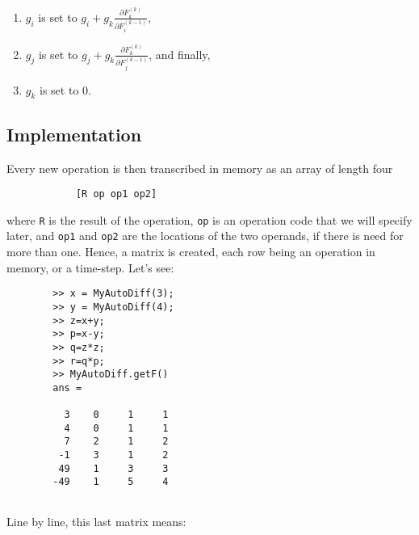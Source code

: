 \documentclass[titlepage]{article}
\theoremstyle{plain}
\theoremstyle{definition}
\begin{document}
		\begin{enumerate}
			\item $g_i$ is set to $g_{i}+g_{k} \frac{\partial F^{(k)}_k}{\partial F^{(k-1)}_i}$,
			\item $g_j$ is set to $g_{j}+g_{k} \frac{\partial F^{(k)}_k}{\partial F^{(k-1)}_j}$, and finally,
			\item $g_k$ is set to 0.
		\end{enumerate}
		
		\subsection{Implementation}
		
		Every new operation is then transcribed in memory as an array of length four
		\begin{verbatim}
			[R op op1 op2]
		\end{verbatim}
		where \texttt{R} is the result of the operation, \texttt{op} is an operation code that we will specify later, and \texttt{op1} and \texttt{op2} are the locations of the two operands, if there is need for more than one. Hence, a matrix is created, each row being an operation in memory, or a time-step. Let's see:
		
		\begin{verbatim}
		>> x = MyAutoDiff(3);		
		>> y = MyAutoDiff(4);			
		>> z=x+y;		
		>> p=x-y;		
		>> q=z*z;		
		>> r=q*p;		
		>> MyAutoDiff.getF()		
		ans =
		
		  3    0     1     1	
		  4    0     1     1	
		  7    2     1     2	
		 -1    3     1     2	
		 49    1     3     3	
		-49    1     5     4
			
		\end{verbatim}
		Line by line, this last matrix means:
		
\end{document}
